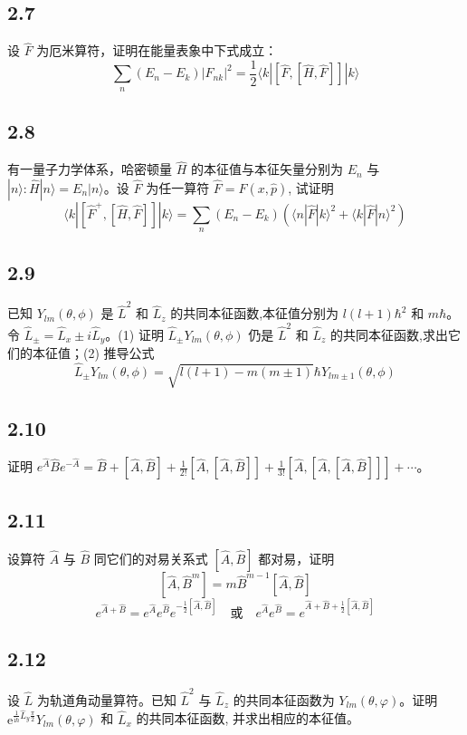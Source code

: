 \subsection{2.7}
设 $\hat{F}$ 为厄米算符，证明在能量表象中下式成立：
$$\sum_{n} (E_n - E_k) |F_{nk}|^2 = \frac{1}{2} \langle k| [\hat{F}, [\hat{H}, \hat{F}]] |k \rangle$$

\subsection{2.8}
有一量子力学体系，哈密顿量 $\hat{H}$ 的本征值与本征矢量分别为 $E_n$ 与 $|n\rangle: \hat{H}|n\rangle = E_n|n\rangle$。设 $\hat{F}$ 为任一算符 $\hat{F} = \hat{F}(x, \hat{p})$, 试证明
$$\langle k|[\hat{F}^+, [\hat{H}, \hat{F}]] |k \rangle = \sum_{n} (E_n - E_k) \left( \langle n|\hat{F}|k\rangle^2 + \langle k|\hat{F}|n\rangle^2 \right)$$

\subsection{2.9}
已知 $Y_{lm}(\theta, \phi)$ 是 $\hat{L}^2$ 和 $\hat{L}_z$ 的共同本征函数,本征值分别为 $l(l+1)\hbar^2$ 和 $m\hbar$。令 $\hat{L}_{\pm} = \hat{L}_x \pm i \hat{L}_y$。(1) 证明 $\hat{L}_{\pm} Y_{lm}(\theta, \phi)$ 仍是 $\hat{L}^2$ 和 $\hat{L}_z$ 的共同本征函数,求出它们的本征值；(2) 推导公式
$$\hat{L}_{\pm} Y_{lm}(\theta, \phi) = \sqrt{l(l+1) - m(m \pm 1)} \hbar Y_{l m \pm 1}(\theta, \phi)$$

\subsection{2.10}
证明 $e^{\hat{A}} \hat{B} e^{-\hat{A}} = \hat{B} + [\hat{A}, \hat{B}] + \frac{1}{2!} [\hat{A}, [\hat{A}, \hat{B}]] + \frac{1}{3!} [\hat{A}, [\hat{A}, [\hat{A}, \hat{B}]]] + \cdots$。

\subsection{2.11}
设算符 $\hat{A}$ 与 $\hat{B}$ 同它们的对易关系式 $[\hat{A}, \hat{B}]$ 都对易，证明
$$[\hat{A}, \hat{B}^m] = m \hat{B}^{m-1} [\hat{A}, \hat{B}] \tag{1}$$
$$e^{\hat{A} + \hat{B}} = e^{\hat{A}} e^{\hat{B}} e^{-\frac{1}{2} [\hat{A}, \hat{B}]} \quad \text{或} \quad e^{\hat{A}} e^{\hat{B}} = e^{\hat{A} + \hat{B} + \frac{1}{2} [\hat{A}, \hat{B}]} \tag{2}$$

\subsection{2.12}
设 $\hat{L}$ 为轨道角动量算符。已知 $\hat{L}^2$ 与 $\hat{L}_z$ 的共同本征函数为 $Y_{lm} (\theta, \varphi)$。证明 $\mathrm{e}^{\frac{1}{\mathrm{i}\hbar}\hat{L}_y\frac{\pi}{2}}Y_{lm}(\theta ,\varphi )$ 和 $\hat{L}_x$ 的共同本征函数, 并求出相应的本征值。

